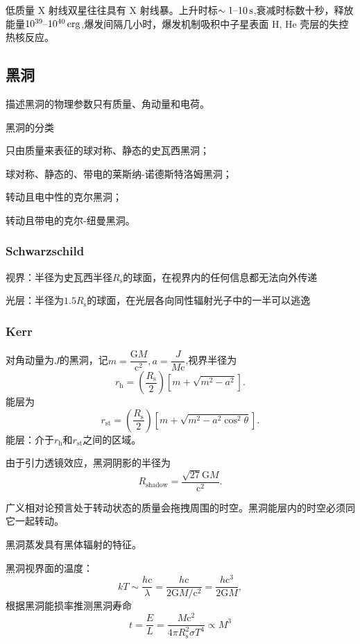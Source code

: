\documentclass[../天体物理基础.tex]{subfiles}
\begin{document}
低质量 X 射线双星往往具有 X 射线暴。上升时标$\sim1\text{\textendash}10\,\unit{s}$,衰减时标数十秒，释放能量$10^{39}\text{\textendash}10^{40}\,\unit{erg}$,爆发间隔几小时，爆发机制吸积中子星表面 H, He 壳层的失控热核反应。

\subsection{黑洞}
描述黑洞的物理参数只有质量、角动量和电荷。

黑洞的分类

只由质量来表征的球对称、静态的史瓦西黑洞；

球对称、静态的、带电的莱斯纳{}-{}诺德斯特洛姆黑洞；

转动且电中性的克尔黑洞；

转动且带电的克尔{}-{}纽曼黑洞。

\subsubsection{Schwarzschild}
视界：半径为史瓦西半径$R_{\text{s}}$的球面，在视界内的任何信息都无法向外传递

光层：半径为$1.5R_{\text{s}}$的球面，在光层各向同性辐射光子中的一半可以逃逸

\subsubsection{Kerr}
对角动量为$J$的黑洞，记$m=\dfrac{\mathrm{G}M}{\mathrm{c}^{2}},a=\dfrac{J}{M\mathrm{c}}$,视界半径为
\begin{equation}
r_{\text{h}}=\left(\frac{R_{\text{s}}}{2}\right)\left[m+\sqrt{m^{2}-a^{2}}\right].
\end{equation}
能层为
\begin{equation}
r_{\text{st}}=\left(\frac{R_{\text{s}}}2\right)\left[m+\sqrt{m^{2}-a^{2}\cos^{2}\theta}\right].
\end{equation}
能层：介于$r_{\text{h}}$和$r_{\text{st}}$之间的区域。

由于引力透镜效应，黑洞阴影的半径为
\begin{equation}
R_{\text{shadow}}=\frac{\sqrt{27}\mathrm{G}M}{\mathrm{c}^{2}}.
\end{equation}

广义相对论预言处于转动状态的质量会拖拽周围的时空。黑洞能层内的时空必须同它一起转动。

黑洞蒸发具有黑体辐射的特征。

黑洞视界面的温度：
\begin{equation}
kT\sim\frac{h\mathrm{c}}{\lambda}=\frac{h\mathrm{c}}{2\mathrm{G}M/\mathrm{c}^{2}}=\frac{h\mathrm{c}^{3}}{2\mathrm{G}M},
\end{equation}
根据黑洞能损率推测黑洞寿命
\begin{equation}
t=\frac{E}{L}=\frac{M\mathrm{c}^{2}}{4\pi R_{\text{s}}^{2}\sigma T^{4}}\propto{}M^{3}
\end{equation}
\end{document}
